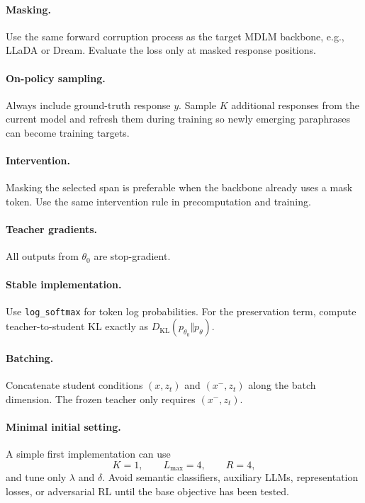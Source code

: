 \documentclass{article}
\begin{document}
\paragraph{Masking.}
Use the same forward corruption process as the target MDLM backbone, e.g.,
LLaDA or Dream. Evaluate the loss only at masked response positions.

\paragraph{On-policy sampling.}
Always include ground-truth response $y$. Sample $K$ additional responses
from the current model and refresh them during training so newly emerging
paraphrases can become training targets.

\paragraph{Intervention.}
Masking the selected span is preferable when the backbone already uses a mask
token. Use the same intervention rule in precomputation and training.

\paragraph{Teacher gradients.}
All outputs from $\theta_0$ are stop-gradient.

\paragraph{Stable implementation.}
Use \texttt{log\_softmax} for token log probabilities. For the preservation
term, compute teacher-to-student KL exactly as
$D_{\mathrm{KL}}(p_{\theta_0}\Vert p_\theta)$.

\paragraph{Batching.}
Concatenate student conditions $(x,z_t)$ and $(x^{-},z_t)$ along the batch
dimension. The frozen teacher only requires $(x^{-},z_t)$.

\paragraph{Minimal initial setting.}
A simple first implementation can use
\[
K=1,\qquad L_{\max}=4,\qquad R=4,
\]
and tune only $\lambda$ and $\delta$. Avoid semantic classifiers, auxiliary
LLMs, representation losses, or adversarial RL until the base objective has
been tested.
\end{document}
